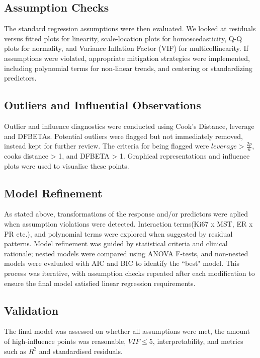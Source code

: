 \documentclass[letter]{article}
\begin{document}
\subsection{Assumption Checks}

The standard regression assumptions were then evaluated. We looked at residuals versus fitted plots for linearity, scale-location plots for homoscedasticity, Q-Q plots for normality,
and Variance Inflation Factor (VIF) for multicollinearity. If assumptions were violated, appropriate mitigation strategies were implemented, including polynomial terms for non-linear trends,
 and centering or standardizing predictors. %

\subsection{Outliers and Influential Observations}

Outlier and influence diagnostics were conducted using Cook's Distance, leverage and DFBETAs. Potential outliers were flagged but not immediately removed, instead kept for further review.
The criteria for being flagged were $leverage > \frac{2p}{n}$, cooks distance > 1, and DFBETA > 1. Graphical representations and influence plots were used to visualise these points.

\subsection{Model Refinement}

As stated above, transformations of the response and/or predictors were aplied when assumption violations were detected. Interaction terms(Ki67 x MST, ER x PR etc.), and polynomial terms were explored when suggested by
residual patterns. Model refinement was guided by statistical criteria and clinical rationale; nested models were compared using ANOVA F-tests, and non-nested models were evaluated with AIC and BIC to identify the ``best" model.
This process was iterative, with assumption checks repeated after each modification to ensure the final model satisfied linear regression requirements.


\subsection{Validation}

The final model was assessed on whether all assumptions were met, the amount of high-influence points was reasonable, $VIF \leq 5$, interpretability, and metrics such as $R^2$ and standardised residuals.
\end{document}
